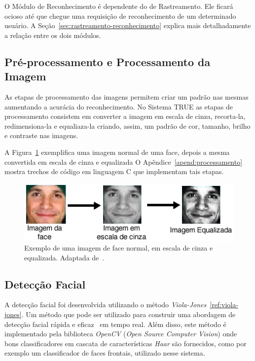 	O Módulo de Reconhecimento é dependente do de Rastreamento. Ele ficará ocioso
	até que chegue uma requisição de reconhecimento de um determinado usuário. A
	Seção~\ref{sec:rastreamento-reconhecimento} explica mais detalhadamente a
	relação entre os dois módulos.

	\subsection{Pré-processamento e Processamento da Imagem}
		
		As etapas de processamento das imagens permitem criar um padrão nas mesmas
		aumentando a acurácia do reconhecimento. No Sistema TRUE as etapas de
		processamento consistem em converter a imagem em escala de cinza, recorta-la,
		redimensiona-la e equaliaza-la criando, assim, um padrão de cor, tamanho,
		brilho e contraste nas imagens.

		A Figura~\ref{fig:greyscale} exemplifica uma imagem normal de uma face,
		depois a mesma convertida em escala de cinza e equalizada O
		Apêndice~\ref{apend:processamento} mostra trechos de código em linguagem C
		que implementam tais etapas.

		\begin{figure}[hbt]
			\begin{center}
				\includegraphics[scale=0.7]{figuras/4.ProblemaEProposta/greyscale.png}
			\end{center}
			\caption{Exemplo de uma imagem de face normal, em escala de cinza e equalizada. Adaptada de~\cite{shervin}.}
			\label{fig:greyscale}
		\end{figure}

	\subsection{Detecção Facial}

		A detecção facial foi desenvolvida utilizando o método \textit{Viola-Jones}~\ref{ref:viola-jones}. Um método que pode ser utilizado para construir uma abordagem de detecção facial rápida e eficaz~\cite{violajones} em tempo real. Além disso, este método é implementado pela biblioteca \textit{OpenCV} (\textit{Open Source Computer Vision}) onde bons classificadores em cascata de características \textit{Haar} são fornecidos, como por exemplo um classificador de faces frontais, utilizado nesse sistema.

